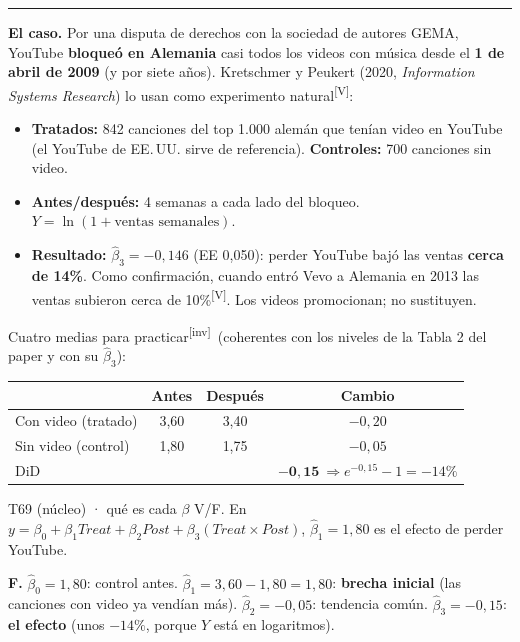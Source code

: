 \documentclass[10pt,a4paper]{article}
\newcommand{\V}{\textsuperscript{\textcolor{green!45!black}{[V]}}}
\newcommand{\inv}{\textsuperscript{\textcolor{red!60!black}{[inv]}}}
\newcommand{\acto}[1]{\vspace{6pt}{\large\bfseries #1}\par\vspace{2pt}\hrule\vspace{4pt}}
\begin{document}
\acto{Acto 4. Alemania sin YouTube: diferencias en diferencias}

\textbf{El caso.} Por una disputa de derechos con la sociedad de autores GEMA, YouTube \textbf{bloqueó en Alemania} casi todos los videos con música desde el \textbf{1 de abril de 2009} (y por siete años). Kretschmer y Peukert (2020, \emph{Information Systems Research}) lo usan como experimento natural\V:
\begin{itemize}[leftmargin=*,itemsep=0pt,topsep=0pt]
\item \textbf{Tratados:} 842 canciones del top 1.000 alemán que tenían video en YouTube (el YouTube de EE.\,UU. sirve de referencia). \textbf{Controles:} 700 canciones sin video.
\item \textbf{Antes/después:} 4 semanas a cada lado del bloqueo. $Y=\ln(1+\text{ventas semanales})$.
\item \textbf{Resultado:} $\hat\beta_3=-0{,}146$ (EE 0,050): perder YouTube bajó las ventas \textbf{cerca de 14\%}. Como confirmación, cuando entró Vevo a Alemania en 2013 las ventas subieron cerca de 10\%\V. Los videos promocionan; no sustituyen.
\end{itemize}
Cuatro medias para practicar\inv\ (coherentes con los niveles de la Tabla 2 del paper y con su $\hat\beta_3$):
\begin{center}\small
\begin{tabular}{lccc}\toprule
 & Antes & Después & Cambio\\\midrule
Con video (tratado) & 3,60 & 3,40 & $-0{,}20$\\
Sin video (control) & 1,80 & 1,75 & $-0{,}05$\\\midrule
DiD & & & $\mathbf{-0{,}15}\ \Rightarrow e^{-0,15}-1=-14\%$\\\bottomrule
\end{tabular}
\end{center}

\begin{enun}{T69 (núcleo) · qué es cada $\beta$}
V/F. En $y=\beta_0+\beta_1Treat+\beta_2Post+\beta_3(Treat\times Post)$, $\hat\beta_1=1{,}80$ es el efecto de perder YouTube.
\end{enun}
\begin{ejemplar}
\textbf{F.} $\hat\beta_0=1{,}80$: control antes. $\hat\beta_1=3{,}60-1{,}80=1{,}80$: \textbf{brecha inicial} (las canciones con video ya vendían más). $\hat\beta_2=-0{,}05$: tendencia común. $\hat\beta_3=-0{,}15$: \textbf{el efecto} (unos $-14\%$, porque $Y$ está en logaritmos).
\end{ejemplar}
\end{document}
